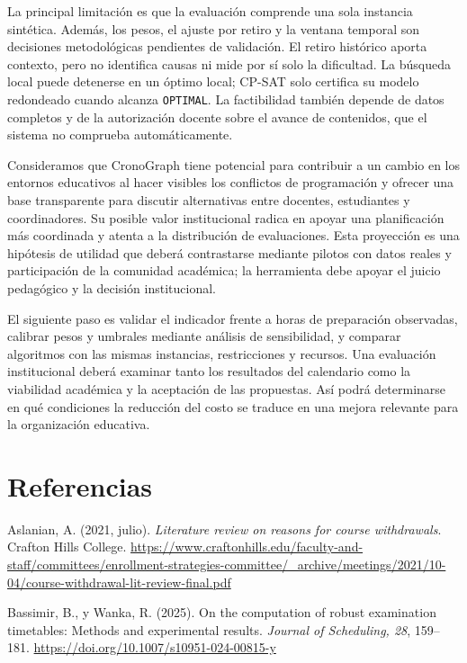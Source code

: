 \documentclass[12pt,letterpaper]{article}
\begin{document}
La principal limitación es que la evaluación comprende una sola instancia sintética. Además, los pesos, el ajuste por retiro y la ventana temporal son decisiones metodológicas pendientes de validación. El retiro histórico aporta contexto, pero no identifica causas ni mide por sí solo la dificultad. La búsqueda local puede detenerse en un óptimo local; CP-SAT solo certifica su modelo redondeado cuando alcanza \texttt{OPTIMAL}. La factibilidad también depende de datos completos y de la autorización docente sobre el avance de contenidos, que el sistema no comprueba automáticamente.

Consideramos que CronoGraph tiene potencial para contribuir a un cambio en los entornos educativos al hacer visibles los conflictos de programación y ofrecer una base transparente para discutir alternativas entre docentes, estudiantes y coordinadores. Su posible valor institucional radica en apoyar una planificación más coordinada y atenta a la distribución de evaluaciones. Esta proyección es una hipótesis de utilidad que deberá contrastarse mediante pilotos con datos reales y participación de la comunidad académica; la herramienta debe apoyar el juicio pedagógico y la decisión institucional.

El siguiente paso es validar el indicador frente a horas de preparación observadas, calibrar pesos y umbrales mediante análisis de sensibilidad, y comparar algoritmos con las mismas instancias, restricciones y recursos. Una evaluación institucional deberá examinar tanto los resultados del calendario como la viabilidad académica y la aceptación de las propuestas. Así podrá determinarse en qué condiciones la reducción del costo se traduce en una mejora relevante para la organización educativa.

\newpage
\section*{Referencias}
\begingroup
\setlength{\parindent}{0pt}
\hangindent=0.5in Aslanian, A. (2021, julio). \textit{Literature review on reasons for course withdrawals}. Crafton Hills College. \url{https://www.craftonhills.edu/faculty-and-staff/committees/enrollment-strategies-committee/_archive/meetings/2021/10-04/course-withdrawal-lit-review-final.pdf}

\hangindent=0.5in Bassimir, B., y Wanka, R. (2025). On the computation of robust examination timetables: Methods and experimental results. \textit{Journal of Scheduling, 28}, 159--181. \url{https://doi.org/10.1007/s10951-024-00815-y}
\end{document}
